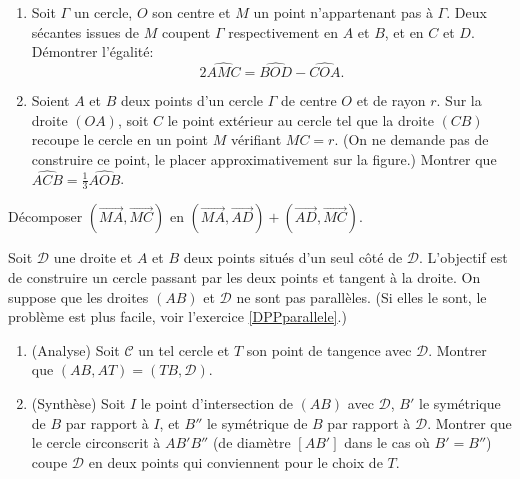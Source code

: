 \begin{exo}[Trisection]%
\begin{enumerate}
\item Soit $\Gamma$ un cercle, $O$ son centre et $M$ un point n'appartenant pas à $\Gamma$. Deux sécantes issues de $M$ coupent $\Gamma$ respectivement en $A$ et $B$, et en $C$ et $D$. Démontrer l'égalité:
\[2 \widehat{AMC} = \widehat{BOD} -  \widehat{COA}.\]
\item Soient $A$ et $B$ deux points d'un cercle $\Gamma$ de centre $O$ et de rayon $r$. Sur la droite $(OA)$, soit $C$ le point extérieur au cercle tel que la droite $(CB)$ recoupe le cercle en un point $M$ vérifiant $MC=r$. (On ne demande pas de construire ce point, le placer approximativement sur la figure.) Montrer que $\widehat{ACB} = \frac13 \widehat{AOB}$.
\end{enumerate}

\begin{hint}   
Décomposer $(\overrightarrow{MA},\overrightarrow{MC})$ en $(\overrightarrow{MA},\overrightarrow{AD}) + (\overrightarrow{AD},\overrightarrow{MC})$.%
\end{hint}  
    
\end{exo}  





\begin{exo}%

Soit $\mathcal D$ une droite et $A$ et $B$ deux points situés d'un seul côté de $\mathcal D$. L'objectif est de construire un cercle passant par les deux points et tangent à la droite. On suppose que les droites $(AB)$ et $\mathcal D$ ne sont pas parallèles. (Si elles le sont, le problème est plus facile, voir l'exercice \ref{DPPparallele}.)

\begin{enumerate}

\item (Analyse) Soit $\mathcal C$ un tel cercle et $T$ son point de tangence avec $\mathcal D$. Montrer que $(AB,AT) = (TB,\mathcal D)$. %
\item (Synthèse) Soit $I$ le point d'intersection de $(AB)$ avec $\mathcal D$, $B'$ le symétrique de $B$ par rapport à $I$, et $B''$ le symétrique de $B$ par rapport à $\mathcal D$. Montrer que le cercle circonscrit à $AB'B''$ (de diamètre $[AB']$ dans le cas où $B'=B''$) coupe $\mathcal D$ en deux points qui conviennent pour le choix de $T$.
\end{enumerate}


 

\end{exo}  


